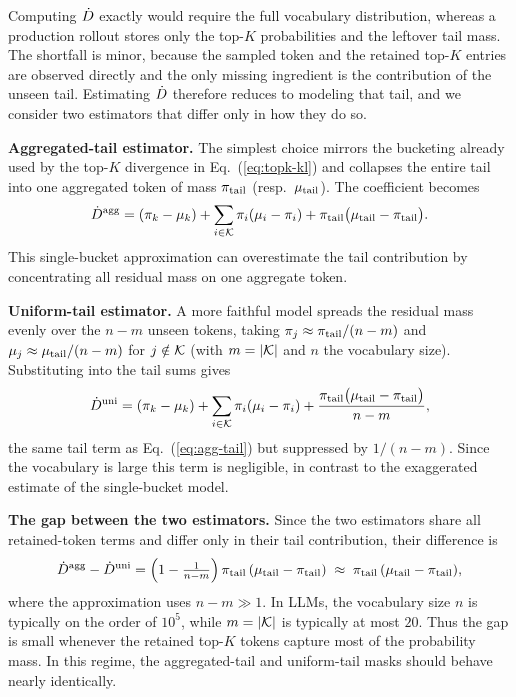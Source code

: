 Computing $\dot{D}$ exactly would require the full vocabulary distribution, whereas a
production rollout stores only the top-$K$ probabilities and the leftover tail mass.
The shortfall is minor, because the sampled token and the retained top-$K$ entries are
observed directly and the only missing ingredient is the contribution of the unseen
tail. Estimating $\dot{D}$ therefore reduces to modeling that tail, and we
consider two estimators that differ only in how they do so.

\noindent\textbf{Aggregated-tail estimator.}
The simplest choice mirrors the bucketing already used by the top-$K$ divergence in
Eq.~(\ref{eq:topk-kl}) and collapses the entire tail into one aggregated token of mass
$\pi_{\mathrm{tail}}$ (resp.\ $\mu_{\mathrm{tail}}$). The coefficient
becomes
\begin{equation}
\label{eq:agg-tail}
\dot{D}^{\mathrm{agg}}=(\pi_k-\mu_k)
+\sum_{i\in\mathcal{K}}\pi_i(\mu_i-\pi_i)
+\pi_{\mathrm{tail}}\big(\mu_{\mathrm{tail}}-\pi_{\mathrm{tail}}\big).
\end{equation}
This single-bucket approximation can overestimate the tail contribution by
concentrating all residual mass on one aggregate token.

\noindent\textbf{Uniform-tail estimator.}
A more faithful model spreads the residual mass evenly over the $n-m$ unseen
tokens, taking $\pi_j\approx\pi_{\mathrm{tail}}/(n-m)$ and
$\mu_j\approx\mu_{\mathrm{tail}}/(n-m)$
for $j\notin\mathcal{K}$ (with $m=|\mathcal{K}|$ and $n$ the vocabulary size). Substituting into
the tail sums gives
\begin{equation}
\label{eq:uni-tail}
\dot{D}^{\mathrm{uni}}=(\pi_k-\mu_k)
+\sum_{i\in\mathcal{K}}\pi_i(\mu_i-\pi_i)
+\frac{\pi_{\mathrm{tail}}\big(\mu_{\mathrm{tail}}-\pi_{\mathrm{tail}}\big)}{n-m},
\end{equation}
the same tail term as Eq.~(\ref{eq:agg-tail}) but suppressed by $1/(n-m)$. Since the
vocabulary is large this term is negligible, in contrast to the exaggerated estimate of
the single-bucket model.

\noindent\textbf{The gap between the two estimators.}
Since the two estimators share all retained-token terms and differ only in their
tail contribution, their difference is
\begin{equation}
\label{eq:tail-gap}
\dot{D}^{\mathrm{agg}}-\dot{D}^{\mathrm{uni}}
=\Big(1-\tfrac{1}{n-m}\Big)\,\pi_{\mathrm{tail}}\,(\mu_{\mathrm{tail}}-\pi_{\mathrm{tail}})
\;\approx\; \pi_{\mathrm{tail}}\,(\mu_{\mathrm{tail}}-\pi_{\mathrm{tail}}),
\end{equation}
where the approximation uses $n-m\gg1$.
In LLMs, the vocabulary size $n$ is typically on the order of $10^5$, while
$m=|\mathcal{K}|$ is typically at most $20$.
Thus the gap is small whenever the retained top-$K$ tokens capture most of the
probability mass.
In this regime, the aggregated-tail and uniform-tail masks should behave nearly
identically.

